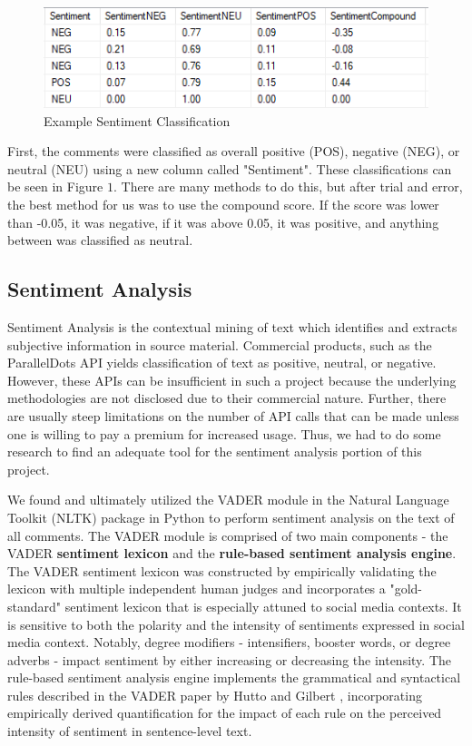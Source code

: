 \documentclass[letterpaper]{article}
\begin{document}
\begin{figure}[!htb]
\begin{center}
\includegraphics[scale=0.6]{Images/sentiment_score.PNG}
\caption{Example Sentiment Classification}
\label{fig1}
\end{center}
\end{figure}

First, the comments were classified as overall positive (POS), negative (NEG), or neutral (NEU) using a new column called "Sentiment". These classifications can be seen in Figure $1$. There are many methods to do this, but after trial and error, the best method for us was to use the compound score. If the score was lower than -0.05, it was negative, if it was above 0.05, it was positive, and anything between was classified as neutral.

\subsection{Sentiment Analysis}

Sentiment Analysis is the contextual mining of text which identifies and extracts subjective information in source material. Commercial products, such as the ParallelDots API yields classification of text as positive, neutral, or negative. However, these APIs can be insufficient in such a project because the underlying methodologies are not disclosed due to their commercial nature. Further, there are usually steep limitations on the number of API calls that can be made unless one is willing to pay a premium for increased usage. Thus, we had to do some research to find an adequate tool for the sentiment analysis portion of this project. 

We found and ultimately utilized the VADER module \cite{VaderModule} in the Natural Language Toolkit (NLTK) package in Python to perform sentiment analysis on the text of all comments. The VADER module is comprised of two main components - the VADER \textbf{sentiment lexicon} and the \textbf{rule-based sentiment analysis engine}. The VADER sentiment lexicon was constructed by empirically validating the lexicon with multiple independent human judges and incorporates a "gold-standard" sentiment lexicon that is especially attuned to social media contexts. It is sensitive to both the polarity and the intensity of sentiments expressed in social media context. Notably, degree modifiers - intensifiers, booster words, or degree adverbs - impact sentiment by either increasing or decreasing the intensity. The rule-based sentiment analysis engine implements the grammatical and syntactical rules described in the VADER paper by Hutto and Gilbert \cite{VaderModule}, incorporating empirically derived quantification for the impact of each rule on the perceived intensity of sentiment in sentence-level text. 
\end{document}

